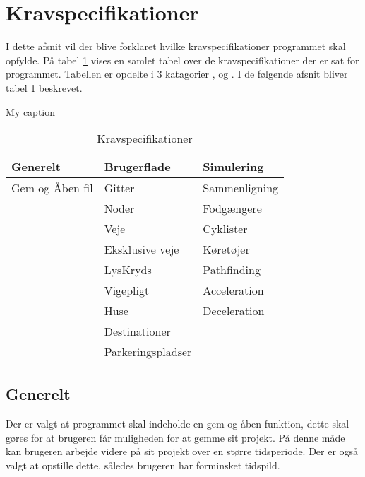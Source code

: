\section{Kravspecifikationer}
I dette afsnit vil der blive forklaret hvilke kravspecifikationer programmet skal opfylde. På tabel \ref{fig:KravspecifikationerTabel} vises en samlet tabel over de kravspecifikationer der er sat for programmet. Tabellen er opdelte i 3 katagorier ,  og . I de følgende afsnit bliver tabel \ref{fig:KravspecifikationerTabel} beskrevet.

\begin{table}[]
\centering
\caption{My caption}
\label{my-label}
\begin{tabular}{|l|l|l|}
\hline
\textbf{Generelt} & \textbf{Brugerflade} & \textbf{Simulering} \\ \hline
Gem og Åben fil   & Gitter               & Sammenligning       \\ \hline
                  & Noder                & Fodgængere          \\ \hline
                  & Veje                 & Cyklister           \\ \hline
                  & Eksklusive veje      & Køretøjer           \\ \hline
                  & LysKryds             & Pathfinding         \\ \hline
                  & Vigepligt            & Acceleration        \\ \hline
                  & Huse                 & Deceleration        \\ \hline
                  & Destinationer        &                     \\ \hline
                  & Parkeringspladser    &                     \\ \hline
\end{tabular}
\caption{Kravspecifikationer}\label{fig:KravspecifikationerTabel}
\end{table}

\subsection{Generelt}
Der er valgt at programmet skal indeholde en gem og åben funktion, dette skal gøres for at brugeren får muligheden for at gemme sit projekt. På denne måde kan brugeren arbejde videre på sit projekt over en større tidsperiode. Der er også valgt at opstille dette, således brugeren har forminsket tidspild.

